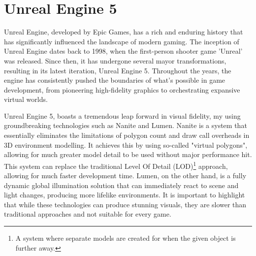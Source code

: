 \section{Unreal Engine 5}

Unreal Engine, developed by Epic Games, has a rich and enduring history that has significantly influenced the landscape of modern gaming. The inception of Unreal Engine dates back to 1998, when the first-person shooter game 'Unreal' was released. Since then, it has undergone several mayor transformations, resulting in its latest iteration, Unreal Engine 5. Throughout the years, the engine has consistently pushed the boundaries of what's possible in game development, from pioneering high-fidelity graphics to orchestrating expansive virtual worlds.

Unreal Engine 5, boasts a tremendous leap forward in visual fidelity, my using groundbreaking technologies such as Nanite and Lumen. 
Nanite is a system that essentially eliminates the limitations of polygon count and draw call overheads in 3D environment modelling. It achieves this by using so-called "virtual polygons", allowing for much greater model detail to be used without major performance hit. This system can replace the traditional Level Of Detail (LOD)\footnote{A system where separate models are created for when the given object is further away.} approach, allowing for much faster development time.
Lumen, on the other hand, is a fully dynamic global illumination solution that can immediately react to scene and light changes, producing more lifelike environments. It is important to highlight that while these technologies can produce stunning visuals, they are slower than traditional approaches and not suitable for every game. 
